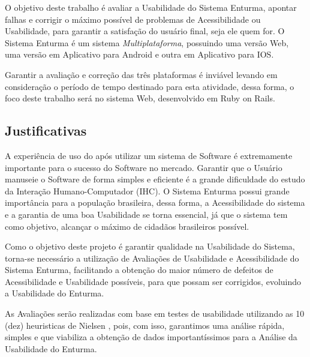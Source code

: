 	O objetivo deste trabalho é avaliar a Usabilidade do Sistema Enturma, apontar falhas e corrigir o máximo possível de problemas de Acessibilidade ou Usabilidade, para garantir a satisfação do usuário final, seja ele quem for. O Sistema Enturma é um sistema \textit{Multiplataforma}, possuindo uma versão Web, uma versão em Aplicativo para Android e outra em Aplicativo para IOS.

	Garantir a avaliação e correção das três plataformas é inviável levando em consideração o período de tempo destinado para esta atividade, dessa forma, o foco deste trabalho será no sistema Web, desenvolvido em Ruby on Rails.



\subsection{Justificativas}

	A experiência de uso do após utilizar um sistema de Software é extremamente importante para o sucesso do Software no mercado. Garantir que o Usuário manuseie o Software de forma simples e eficiente é a grande dificuldade do estudo da Interação Humano-Computador (IHC).
	O Sistema Enturma possui grande importância para a população brasileira, dessa forma, a Acessibilidade do sistema e a garantia de uma boa Usabilidade se torna essencial, já que o sistema tem como objetivo, alcançar o máximo de cidadãos brasileiros possível.

	Como o objetivo deste projeto é garantir qualidade na Usabilidade do Sistema, torna-se necessário a utilização de Avaliações de Usabilidade e Acessibilidade do Sistema Enturma, facilitando a obtenção do maior número de defeitos de Acessibilidade e Usabilidade possíveis, para que possam ser corrigidos, evoluindo a Usabilidade do Enturma.
	
	As Avaliações serão realizadas com base em testes de usabilidade utilizando as 10 (dez) heuristicas de Nielsen \cite{usabilidade_web}, pois, com isso, garantimos uma análise rápida, simples e que viabiliza a obtenção de dados importantíssimos para a Análise da Usabilidade do Enturma.


